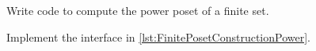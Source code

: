 
\begin{codeexercise}
    Write code to compute the power poset of a finite set.

    Implement the interface in \cref{lst:FinitePosetConstructionPower}.
\end{codeexercise}


